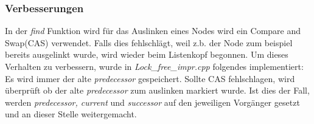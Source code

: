 \subsubsection{Verbesserungen}
\label{subsec:impr}
In der \textit{find} Funktion wird für das Auslinken eines Nodes wird ein Compare and Swap(CAS) verwendet. Falls dies fehlschlägt, 
weil z.b. der Node zum beispiel bereits ausgelinkt wurde,
wird wieder beim Listenkopf begonnen. Um dieses Verhalten zu verbessern, wurde in \textit{Lock\_free\_impr.cpp} folgendes implementiert:\\
Es wird immer der alte \textit{predecessor} gespeichert. Sollte CAS fehlschlagen, wird überprüft ob der alte \textit{predecessor}
zum auslinken markiert wurde. Ist dies der Fall, werden \textit{predecessor, current} und \textit{successor} auf den jeweiligen Vorgänger
gesetzt und an dieser Stelle weitergemacht. 